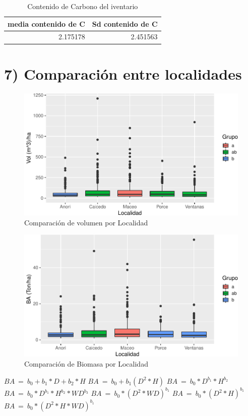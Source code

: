 \documentclass[9pt,onecolumn,twoside,]{pinp}
\begin{document}
\begin{table}

\caption{\label{tab:unnamed-chunk-30}Contenido de Carbono del iventario}
\centering
\begin{tabular}[t]{r|r}
\hline
media contenido de C & Sd contenido de C\\
\hline
2.175178 & 2.451563\\
\hline
\end{tabular}
\end{table}

\hypertarget{comparaciuxf3n-entre-localidades}{%
\section{7) Comparación entre
localidades}\label{comparaciuxf3n-entre-localidades}}

\begin{figure}

{\centering \includegraphics{David_Londono_Lopera_Cristian_Ganan_parcial3_files/figure-latex/unnamed-chunk-31-1} 

}

\caption{Comparación de volumen por Localidad}\label{fig:unnamed-chunk-31}
\end{figure}

\begin{figure}

{\centering \includegraphics{David_Londono_Lopera_Cristian_Ganan_parcial3_files/figure-latex/unnamed-chunk-32-1} 

}

\caption{Comparación de Biomasa por Localidad}\label{fig:unnamed-chunk-32}
\end{figure}

\(BA \ = \ b_0 + b_1*D+b_2*H\) \(BA \ = \ b_0+b_1(D^2*H)\)
\(BA \ = \ b_0*D^{b_1}*H^{b_2}\)
\(BA \ = \ b_0*D^{b_1}*H^{b_2}*WD^{b_3}\)
\(BA \ = \ b_0*(D^2*WD)^{b_1}\) \(BA \ = \ b_0*(D^2*H)^{b_1}\)
\(BA \ = \ b_0*(D^2*H*WD)^{b_1}\)


\pnasbreak 
\end{document}

